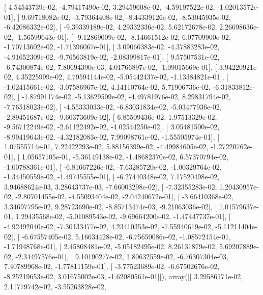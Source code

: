 \documentclass{article}
\begin{document}
       [  4.54543739e-02,  -4.79417490e-02,   3.29459608e-02,
         -4.59197522e-02,  -1.02013572e-01],
       [  9.69718082e-02,  -3.79364408e-02,  -8.44339126e-02,
         -8.53045935e-02,  -6.42086332e-02],
       [ -9.39339189e-02,   4.29332336e-02,   5.62172678e-02,
          2.26698636e-02,  -1.56599643e-01],
       [ -9.12869009e-02,  -8.14661512e-02,   6.07709900e-02,
         -1.70713602e-02,  -1.71396067e-01],
       [  3.09066383e-02,  -4.37883283e-02,  -4.91652309e-02,
         -9.76563819e-02,  -2.08399817e-01],
       [  9.57507531e-02,  -6.74300874e-02,   7.80694390e-03,
          4.01766897e-02,  -1.09015669e-01],
       [  3.94220921e-02,   4.35225999e-02,   4.79594144e-02,
         -5.05442437e-02,  -1.13384821e-01],
       [ -1.02415661e-02,  -3.07586967e-02,   4.14110764e-02,
          5.71906736e-02,  -6.31833812e-02],
       [ -1.87991174e-02,  -5.13629509e-02,  -4.49781976e-02,
          8.29831794e-02,  -7.76518023e-02],
       [ -4.55333033e-02,  -6.83031834e-02,  -5.03477936e-02,
         -2.89451687e-02,  -9.60373609e-02],
       [  6.85509436e-02,   1.97513329e-02,  -9.56712249e-02,
         -2.61122492e-02,  -4.02544250e-02],
       [  3.05481500e-02,  -8.99419643e-02,  -4.32182083e-02,
          7.99098761e-02,  -1.55505974e-01],
       [  1.07555714e-01,   7.22422293e-02,   5.88156399e-02,
         -4.49984605e-02,  -1.27220762e-01],
       [  1.05657105e-01,  -5.36149138e-02,  -1.48682370e-02,
          6.57370794e-02,  -1.00788361e-01],
       [ -6.81667226e-02,  -7.63285720e-02,  -1.00329764e-02,
         -1.34450559e-02,  -1.49745555e-01],
       [ -6.27440348e-02,   7.17520498e-02,   3.94688624e-03,
          3.28643737e-03,  -7.66003298e-02],
       [ -7.32355283e-02,   1.20430957e-02,  -2.80701455e-02,
         -4.55093404e-02,  -2.04240672e-01],
       [ -3.66410368e-02,   3.34697795e-02,   9.28723690e-02,
         -8.85713474e-03,  -9.21063036e-02],
       [  1.01579637e-01,   1.29435568e-02,  -5.01089543e-02,
         -9.69664200e-02,  -1.47447737e-01],
       [ -4.92492040e-02,  -7.30133477e-02,   4.23410353e-02,
         -7.55940619e-02,  -5.11211404e-02],
       [ -6.67557405e-02,   5.16634428e-02,  -6.75650086e-02,
         -1.08572454e-01,  -1.71948768e-01],
       [  2.45808481e-02,  -5.05182495e-02,   8.26131879e-02,
          5.69207889e-02,  -2.34497576e-01],
       [  9.10190277e-02,   1.80632559e-02,  -6.76307304e-03,
          7.40789968e-02,  -1.77811159e-01],
       [ -3.77523689e-02,  -6.67502676e-02,  -8.25219653e-02,
          3.01675002e-03,  -1.62080561e-01]]), array([[  3.29586171e-02,   2.11779742e-02,  -3.55263828e-02,
\end{document}
